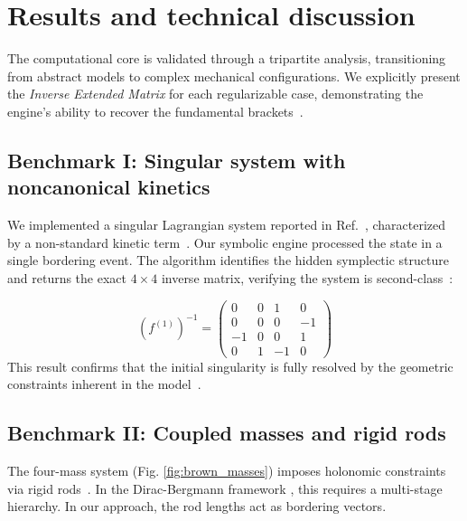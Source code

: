 \documentclass[11pt,a4paper]{article}
\begin{document}
	
	
	\section{Results and technical discussion}\label{sec4}
	
	
	The computational core is validated through a tripartite analysis, transitioning from abstract models to complex mechanical configurations. We explicitly present the \textit{Inverse Extended Matrix} for each regularizable case, demonstrating the engine's ability to recover the fundamental brackets~\cite{Dirac1964,Henneaux1992}.
	
	
	\subsection{Benchmark I: Singular system with noncanonical kinetics}


We implemented a singular Lagrangian system reported in Ref.~\cite{HojmanUrrutia1981}, characterized by a non-standard kinetic term~\cite{MukherjeeSaha1988,Montani1993}. Our symbolic engine processed the state in a single bordering event. The algorithm identifies the hidden symplectic structure and returns the exact $4 \times 4$ inverse matrix, verifying the system is second-class~\cite{Dirac1964}:

\begin{equation}
	(f^{(1)})^{-1} = 
	\begin{pmatrix}
		0 & 0 & 1 & 0 \\
		0 & 0 & 0 & -1 \\
		-1 & 0 & 0 & 1 \\
		0 & 1 & -1 & 0
	\end{pmatrix}
\end{equation}
This result confirms that the initial singularity is fully resolved by the geometric constraints inherent in the model~\cite{HojmanUrrutia1981}.


\subsection{Benchmark II: Coupled masses and rigid rods}


The four-mass system (Fig. \ref{fig:brown_masses}) imposes holonomic constraints via rigid rods~\cite{Goldstein2002,Arnold1978}. In the Dirac-Bergmann framework \cite{Brown2023,Dirac1964,Bergmann1949}, this requires a multi-stage hierarchy. In our approach, the rod lengths act as bordering vectors. 
\end{document}
